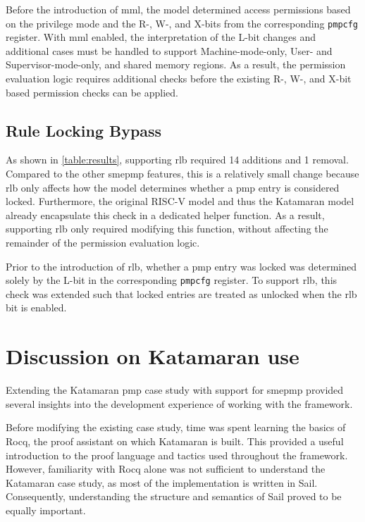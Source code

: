 Before the introduction of \gls{mml}, the model determined access permissions based on the privilege mode and the R-, W-, and X-bits from the corresponding \texttt{pmpcfg} register.
With \gls{mml} enabled, the interpretation of the L-bit changes and additional cases must be handled to support Machine-mode-only, User- and Supervisor-mode-only, and shared memory regions.
As a result, the permission evaluation logic requires additional checks before the existing R-, W-, and X-bit based permission checks can be applied.

\subsection{Rule Locking Bypass}
As shown in \cref{table:results}, supporting \gls{rlb} required 14 additions and 1 removal.
Compared to the other \gls{smepmp} features, this is a relatively small change because \gls{rlb} only affects how the model determines whether a \gls{pmp} entry is considered locked.
Furthermore, the original RISC-V model and thus the Katamaran model already encapsulate this check in a dedicated helper function.
As a result, supporting \gls{rlb} only required modifying this function, without affecting the remainder of the permission evaluation logic.

Prior to the introduction of \gls{rlb}, whether a \gls{pmp} entry was locked was determined solely by the L-bit in the corresponding \texttt{pmpcfg} register.
To support \gls{rlb}, this check was extended such that locked entries are treated as unlocked when the \gls{rlb} bit is enabled.

\section{Discussion on Katamaran use}
Extending the Katamaran \gls{pmp} case study with support for \gls{smepmp} provided several insights into the development experience of working with the framework.

Before modifying the existing case study, time was spent learning the basics of Rocq, the proof assistant on which Katamaran is built.
This provided a useful introduction to the proof language and tactics used throughout the framework.
However, familiarity with Rocq alone was not sufficient to understand the Katamaran case study, as most of the implementation is written in \textmu{}Sail.
Consequently, understanding the structure and semantics of \textmu{}Sail proved to be equally important.


